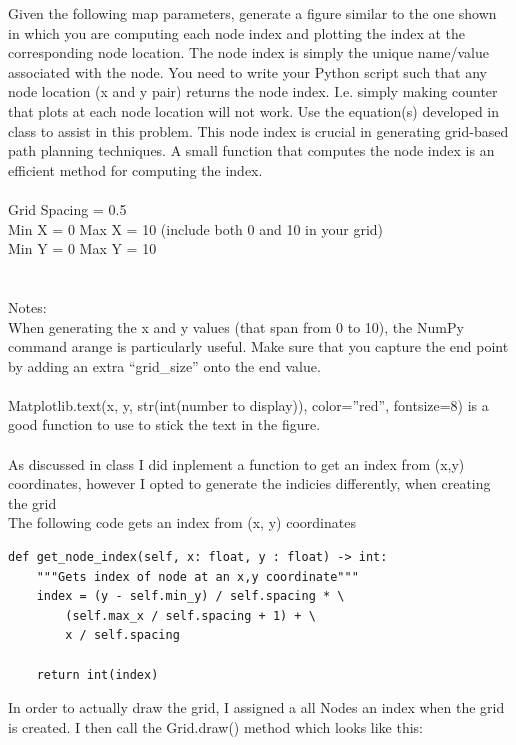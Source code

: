\documentclass{article}
\begin{document}
Given the following map parameters, generate a figure similar to the one shown in which you are 
computing each node index and plotting the index at the corresponding node location. The node 
index is simply the unique name/value associated with the node. You need to write your Python 
script such that any node location (x and y pair) returns the node index. I.e. simply making counter 
that plots at each node location will not work. Use the equation(s) developed in class to assist in this 
problem. This node index is crucial in generating grid-based path planning techniques. A small 
function that computes the node index is an efficient method for computing the index. 
\\\\
Grid Spacing = 0.5\\
Min X = 0  Max X = 10 (include both 0 and 10 in your grid)\\
Min Y = 0  Max Y = 10\\
\\\\
Notes:
\\
When generating the x and y values (that span from 0 to 10), the NumPy command arange is 
particularly useful. Make sure that you capture the end point by adding an extra “grid\_size” onto the 
end value. 
\\\\
Matplotlib.text(x, y, str(int(number to display)), color=”red”, fontsize=8) is a good function to use to 
stick the text in the figure.
\\\\

As discussed in class I did inplement a function to get an index from (x,y) coordinates,
however I opted to generate the indicies differently, when creating the grid
\\
The following code gets an index from (x, y) coordinates
\begin{verbatim}
def get_node_index(self, x: float, y : float) -> int:
    """Gets index of node at an x,y coordinate"""    
    index = (y - self.min_y) / self.spacing * \
        (self.max_x / self.spacing + 1) + \
        x / self.spacing
    
    return int(index)
\end{verbatim}

In order to actually draw the grid, I assigned a all Nodes an index when the grid is created.
I then call the Grid.draw() method which looks like this:
\end{document}
